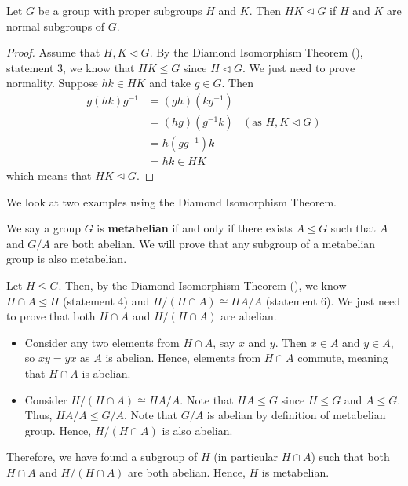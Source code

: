 \begin{corollary}\label{corollary-subgroup-product-is-normal-subgroup-if-subgroups-are-normal}
    Let $G$ be a group with proper subgroups $H$ and $K$. Then $HK \unlhd G$ if $H$ and $K$ are normal subgroups of $G$.
\end{corollary}
\begin{proof}
    Assume that $H, K \lhd G$. By the Diamond Isomorphism Theorem (), statement 3, we know that $HK \leq G$ since $H \lhd G$. We just need to prove normality. Suppose $hk \in HK$ and take $g \in G$. Then
    \begin{align*}
        g(hk)g^{-1} &= (gh)(kg^{-1})\\
        &= (hg)(g^{-1}k) & (\text{as } H, K \lhd G)\\
        &= h(gg^{-1})k\\
        &= hk \in HK
    \end{align*}
    which means that $HK \unlhd G$.
\end{proof}

We look at two examples using the Diamond Isomorphism Theorem.
\begin{example}
    We say a group $G$ is \textbf{metabelian} if and only if there exists $A \unlhd G$ such that $A$ and $G/A$ are both abelian. We will prove that any subgroup of a metabelian group is also metabelian.

    Let $H \leq G$. Then, by the Diamond Isomorphism Theorem (), we know $H \cap A \unlhd H$ (statement 4) and $H/(H \cap A) \cong HA / A$ (statement 6). We just need to prove that both $H \cap A$ and $H/(H \cap A)$ are abelian.
    \begin{itemize}
        \item Consider any two elements from $H \cap A$, say $x$ and $y$. Then $x \in A$ and $y \in A$, so $xy = yx$ as $A$ is abelian. Hence, elements from $H \cap A$ commute, meaning that $H \cap A$ is abelian.
        \item Consider $H/(H\cap A) \cong HA / A$. Note that $HA \leq G$ since $H \leq G$ and $A \leq G$. Thus, $HA / A \leq G / A$. Note that $G/A$ is abelian by definition of metabelian group. Hence, $H/(H \cap A)$ is also abelian.
    \end{itemize}
    Therefore, we have found a subgroup of $H$ (in particular $H \cap A$) such that both $H \cap A$ and $H/(H\cap A)$ are both abelian. Hence, $H$ is metabelian.
\end{example}

